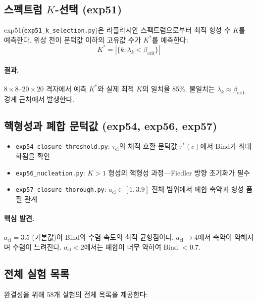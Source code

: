 \subsection{스펙트럼 $K$-선택 (exp51)}

exp51(\texttt{exp51\_k\_selection.py})은 라플라시안 스펙트럼으로부터 최적 형성 수 $K$를 예측한다. 위상 전이 문턱값 이하의 고유값 수가 $K^*$를 예측한다:
\begin{equation}
    K^* = |\{k : \lambda_k < \beta_{\mathrm{crit}}\}|
\end{equation}

\paragraph{결과.} $8 \times 8$--$20 \times 20$ 격자에서 예측 $K^*$와 실제 최적 $K$의 일치율 85\%. 불일치는 $\lambda_k \approx \beta_{\mathrm{crit}}$ 경계 근처에서 발생한다.

\subsection{핵형성과 폐합 문턱값 (exp54, exp56, exp57)}

\begin{itemize}
    \item \texttt{exp54\_closure\_threshold.py}: $\tau_{\mathrm{cl}}$의 체적-호환 문턱값 $\tau^*(c)$에서 Bind가 최대화됨을 확인
    \item \texttt{exp56\_nucleation.py}: $K > 1$ 형성의 핵형성 과정---Fiedler 방향 초기화가 필수
    \item \texttt{exp57\_closure\_thorough.py}: $a_{\mathrm{cl}} \in [1, 3.9]$ 전체 범위에서 폐합 축약과 형성 품질 관계
\end{itemize}

\paragraph{핵심 발견.} $a_{\mathrm{cl}} = 3.5$ (기본값)이 Bind와 수렴 속도의 최적 균형점이다. $a_{\mathrm{cl}} \to 4$에서 축약이 약해지며 수렴이 느려진다. $a_{\mathrm{cl}} < 2$에서는 폐합이 너무 약하여 Bind $< 0.7$.

\subsection{전체 실험 목록}

완결성을 위해 58개 실험의 전체 목록을 제공한다:

